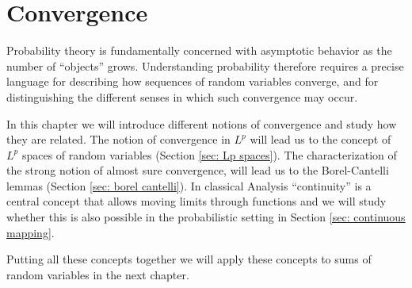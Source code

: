 \chapter{Convergence}


Probability theory is fundamentally concerned with asymptotic behavior as
the number of ``objects'' grows. Understanding probability therefore requires a
precise language for describing how sequences of random variables converge, and
for distinguishing the different senses in which such convergence may occur.

In this chapter we will introduce different notions of convergence and study how
they are related. The notion of convergence in \(L^p\) will lead us to the concept
of \(L^p\) spaces of random variables (Section \ref{sec: Lp spaces}). The
characterization of the strong notion of almost sure convergence, will lead us
to the Borel-Cantelli lemmas (Section \ref{sec: borel cantelli}).
In classical Analysis ``continuity'' is a central concept that allows
moving limits through functions and we will study whether this is also possible
in the probabilistic setting in Section \ref{sec: continuous mapping}.

Putting all these concepts together we will apply these concepts to
sums of random variables in the next chapter.






